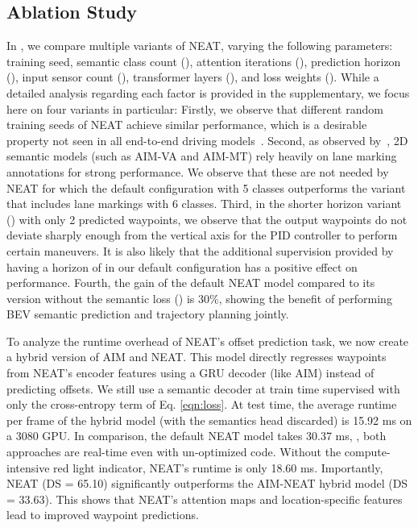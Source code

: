 \subsection{Ablation Study}

In , we compare multiple variants of NEAT, varying the following parameters: training seed, semantic class count (), attention iterations (), prediction horizon (), input sensor count (), transformer layers (), and loss weights (). While a detailed analysis regarding each factor is provided in the supplementary, we focus here on four variants in particular: Firstly, we observe that different random training seeds of NEAT achieve similar performance, which is a desirable property not seen in all end-to-end driving models~\cite{Behl2020IROS}. Second, as observed by~\cite{Behl2020IROS}, 2D semantic models (such as AIM-VA and AIM-MT) rely heavily on lane marking annotations for strong performance. We observe that these are not needed by NEAT for which the default configuration with 5 classes outperforms the variant that includes lane markings with 6 classes. Third, in the shorter horizon variant () with only 2 predicted waypoints, we observe that the output waypoints do not deviate sharply enough from the vertical axis for the PID controller to perform certain maneuvers. It is also likely that the additional supervision provided by having a horizon of  in our default configuration has a positive effect on performance. Fourth, the gain of the default NEAT model compared to its version without the semantic loss () is 30\%, showing the benefit of performing BEV semantic prediction and trajectory planning jointly.

 To analyze the runtime overhead of NEAT's offset prediction task, we now create a hybrid version of AIM and NEAT. This model directly regresses waypoints from NEAT's encoder features  using a GRU decoder (like AIM) instead of predicting offsets. We still use a semantic decoder at train time supervised with only the cross-entropy term of Eq. \eqref{eqn:loss}. At test time, the average {runtime} per frame of the hybrid model (with the semantics head discarded) is 15.92 ms on a 3080 GPU. In comparison, the default NEAT model takes 30.37 ms, \ie, both approaches are real-time even with un-optimized code. Without the compute-intensive red light indicator, NEAT's runtime is only 18.60 ms. Importantly, NEAT (DS = 65.10) {significantly outperforms} the AIM-NEAT hybrid model (DS = 33.63). This shows that NEAT's attention maps and location-specific features lead to improved waypoint predictions.

